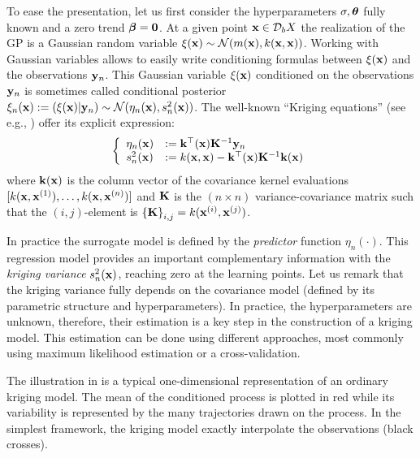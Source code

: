 To ease the presentation, let us first consider the hyperparameters $\sigma, {\boldsymbol{\theta}}$ fully known and a zero trend ${\boldsymbol{\beta}} = \textbf{0}$. 
At a given point ${\bf x} \in \mathcal{D}_bX$ the realization of the GP is a Gaussian random variable $\xi({\bf x}) \sim \mathcal{N}(m({\bf x}), k({\bf x}, {\bf x}))$. 
Working with Gaussian variables allows to easily write conditioning formulas between $\xi({\bf x})$ and the observations ${\bf y}_n$. 
This Gaussian variable $\xi({\bf x})$ conditioned on the observations ${\bf y}_n$ is sometimes called conditional posterior $\xi_n({\bf x}) := (\xi({\bf x}) | {\bf y}_n) \sim \mathcal{N}(\eta_n({\bf x}), s_n^2({\bf x}))$. 
The well-known ``Kriging equations'' (see e.g., \citealt{rasmussen_2006}) offer its explicit expression:
\begin{equation}
    \left\{
    \begin{array}{ll}
        \eta_n({\bf x}) &:= {\bf k}^\top({\bf x}) {\bf K}^{-1} {\bf y}_n\\
        s_n^2({\bf x}) &:= k({\bf x}, {\bf x}) - {\bf k}^\top({\bf x}) {\bf K}^{-1} {\bf k}({\bf x})
    \end{array}
\right.
\label{eq:kriging}
\end{equation}
where ${\bf k}({\bf x})$ is the column vector of the covariance kernel evaluations $[k({\bf x}, {\bf x}^{(1)}), \dots,\allowbreak k({\bf x}, {\bf x}^{(n)})]$ and ${\bf K}$ is the $(n \times n)$ 
variance-covariance matrix such that the $(i, j)$-element is $\left\{{\bf K} \right\}_{i, j}=k({\bf x}^{(i)}, {\bf x}^{(j)})$.

In practice the surrogate model is defined by the \textit{predictor} function $\eta_n(\cdot)$. 
This regression model provides an important complementary information with the \textit{kriging variance} $s_n^2({\bf x})$, reaching zero at the learning points. 
Let us remark that the kriging variance fully depends on the covariance model (defined by its parametric structure and hyperparameters). 
In practice, the hyperparameters are unknown, therefore, their estimation is a key step in the construction of a kriging model. 
This estimation can be done using different approaches, most commonly using maximum likelihood estimation or a cross-validation.

The illustration in  is a typical one-dimensional representation of an ordinary kriging model. 
The mean of the conditioned process is plotted in red while its variability is represented by the many trajectories drawn on the process. 
In the simplest framework, the kriging model exactly interpolate the observations (black crosses). 

